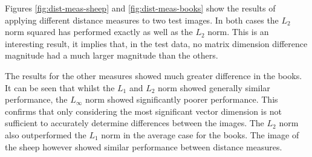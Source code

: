 \begin{appendices}
Figures \ref{fig:dist-meas-sheep} and \ref{fig:dist-meas-books} show the results of applying different distance measures to two test images. In both cases the $L_2$ norm squared has performed exactly as well as the $L_2$ norm. This is an interesting result, it implies that, in the test data, no matrix dimension difference magnitude had a much larger magnitude than the others.

The results for the other measures showed much greater difference in the books. It can be seen that whilst the $L_1$ and $L_2$ norm showed generally similar performance, the $L_\infty$ norm showed significantly poorer performance. This confirms that only considering the most significant vector dimension is not sufficient to accurately determine differences between the images. The $L_2$ norm also outperformed the $L_1$ norm in the average case for the books. The image of the sheep however showed similar performance between distance measures.

\end{appendices}